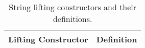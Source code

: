 \begin{table}[t]
\caption{\label{tab:LiftingConsStr}String lifting constructors and their definitions.}
\vspace{-5px}
\begin{scriptsize}
\begin{center}
\begin{tabular}{|l|l|}
\hline
\multicolumn{1}{|c|}{\Tstrut \Bstrut\footnotesize Lifting Constructor} & \multicolumn{1}{c|}{\Tstrut \Bstrut \footnotesize Definition} \\
\hline
\hline

\end{tabular}
\end{center}
\end{scriptsize}
\end{table}
